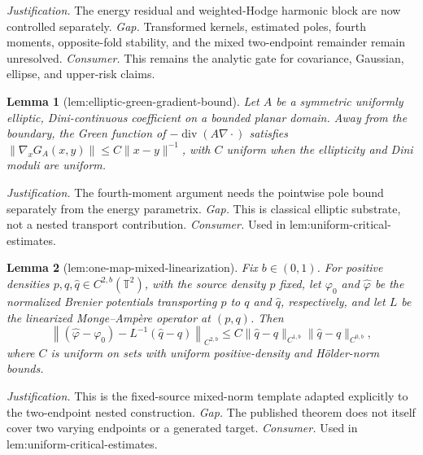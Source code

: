 \documentclass{article}
\newtheorem{lemma}{Lemma}
\begin{document}
\par\smallskip\noindent \textit{Justification.} The energy residual and weighted-Hodge harmonic block are now controlled separately. \textit{Gap.} Transformed kernels, estimated poles, fourth moments, opposite-fold stability, and the mixed two-endpoint remainder remain unresolved. \textit{Consumer.} This remains the analytic gate for covariance, Gaussian, ellipse, and upper-risk claims.

\begin{lemma}[lem:elliptic-green-gradient-bound]\label{lem:elliptic-green-gradient-bound}
Let \(A\) be a symmetric uniformly elliptic, Dini-continuous coefficient on a bounded planar domain.  Away from the boundary, the Green function of \(-\operatorname{div}(A\nabla\cdot)\) satisfies \(\lVert\nabla_xG_A(x,y)\rVert\leq C\lVert x-y\rVert^{-1}\), with \(C\) uniform when the ellipticity and Dini moduli are uniform.
\end{lemma}
\par\smallskip\noindent \textit{Justification.} The fourth-moment argument needs the pointwise pole bound separately from the energy parametrix. \textit{Gap.} This is classical elliptic substrate, not a nested transport contribution. \textit{Consumer.} Used in lem:uniform-critical-estimates.

\begin{lemma}[lem:one-map-mixed-linearization]\label{lem:one-map-mixed-linearization}
Fix \(b\in(0,1)\).  For positive densities \(p,q,\widehat q\in C^{2,b}(\mathbb T^2)\), with the source density \(p\) fixed, let \(\varphi_0\) and \(\widehat\varphi\) be the normalized Brenier potentials transporting \(p\) to \(q\) and \(\widehat q\), respectively, and let \(L\) be the linearized Monge--Amp\`ere operator at \((p,q)\).  Then
\[
 \left\lVert (\widehat\varphi-\varphi_0)-L^{-1}(\widehat q-q)\right\rVert_{C^{2,b}}
 \leq C\lVert\widehat q-q\rVert_{C^{1,b}}
          \lVert\widehat q-q\rVert_{C^{0,b}},
\]
where \(C\) is uniform on sets with uniform positive-density and H\"older-norm bounds.
\end{lemma}
\par\smallskip\noindent \textit{Justification.} This is the fixed-source mixed-norm template adapted explicitly to the two-endpoint nested construction. \textit{Gap.} The published theorem does not itself cover two varying endpoints or a generated target. \textit{Consumer.} Used in lem:uniform-critical-estimates.
\end{document}
